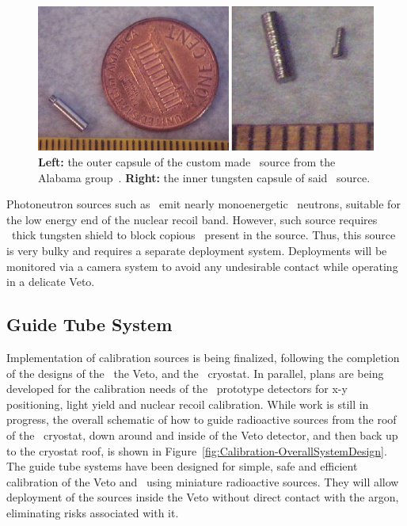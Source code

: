 \begin{figure}[!t]
\centering
\includegraphics[width=\columnwidth]{./Figures/Cal-AmBeMiniatureUA.jpg}
\caption[Pictures of the miniature \AmBe\ neutron source]{{\bf Left:} the outer capsule of the custom made \AmBe\ source from the Alabama group~\cite{Ostrovkskiy:2012wv}.  {\bf Right:} the inner tungsten capsule of said \AmBe\ source.}
\label{fig:Cal-AmBeMiniatureUA}
\end{figure}

Photoneutron sources such as \YBe\ emit nearly monoenergetic \YBeNeutronEnergy\ neutrons, suitable for the low energy end of the nuclear recoil band. However, such source requires \TungstenShieldThickness\ thick tungsten shield to block copious \grs\ present in the source. Thus, this source is very bulky and requires a separate deployment system. Deployments will be monitored via a camera system to avoid any undesirable contact while operating in a delicate Veto.


\subsection{Guide Tube System}

Implementation of calibration sources is being finalized, following the completion of the designs of the \TPC\, the Veto, and the \AAr\ cryostat. In parallel, plans are being developed for the calibration needs of the \DSks\ prototype detectors for x-y positioning, light yield and nuclear recoil calibration. While work is still in progress, the overall schematic of how to guide radioactive sources from the roof of the \AAr\ cryostat, down around and inside of the Veto detector, and then back up to the cryostat roof, is shown in Figure~\ref{fig:Calibration-OverallSystemDesign}.  The guide tube systems have been designed for simple, safe and efficient calibration of the Veto and \TPC\ using miniature radioactive sources. They will allow deployment of the sources inside the Veto without direct contact with the argon, eliminating risks associated with it. 

